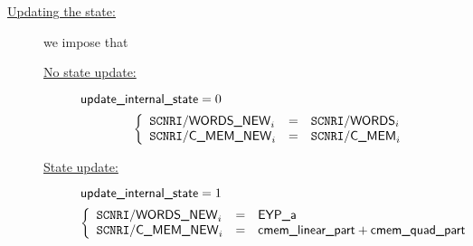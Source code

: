 \begin{description}
\[		\]
	\item[\underline{\underline{Updating the state:}}] 
		we impose that
		\begin{description}
			\item[\underline{No state update:}]
				\If $\textsf{update\_internal\_state} = 0$ \Then
				\[
					\left\{ \begin{array}{lcl}
						\texttt{SCNRI}\textsf{/}{\textsf{\textsf{WORDS\_NEW}}} _{i} & = & \texttt{SCNRI}\textsf{/}{\textsf{\textsf{WORDS}}} _{i} \\
						\texttt{SCNRI}\textsf{/}{\textsf{\textsf{C\_MEM\_NEW}}}  _{i} & = & \texttt{SCNRI}\textsf{/}{\textsf{\textsf{C\_MEM}}}  _{i} \\
					\end{array} \right.
				\]
			\item[\underline{State update:}]
				\If $\textsf{update\_internal\_state} = 1$ \Then
				\[
					\left\{ \begin{array}{lcl}
						\texttt{SCNRI}\textsf{/}{\textsf{\textsf{WORDS\_NEW}}} _{i} & = & \textsf{EYP\_a}                            \\
						\texttt{SCNRI}\textsf{/}{\textsf{\textsf{C\_MEM\_NEW}}}  _{i} & = & \textsf{cmem\_linear\_part} + \textsf{cmem\_quad\_part} \\
					\end{array} \right.
				\]
		\end{description}
\end{description}


